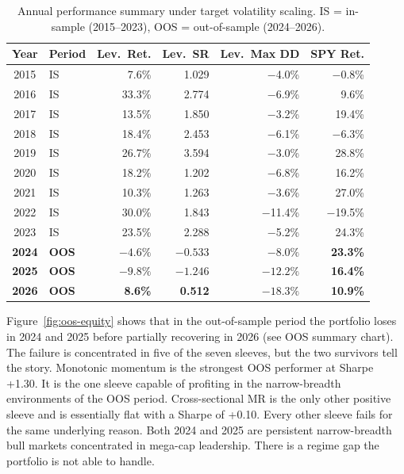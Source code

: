 \documentclass{article}
\begin{document}
\begin{table}[htbp]
    \centering
    \small
    \begin{tabular}{clrrrr}
        \toprule
        Year & Period & Lev.\ Ret. & Lev.\ SR & Lev.\ Max DD & SPY Ret. \\
        \midrule
        2015 & IS &     7.6\% &    1.029 &  $-$4.0\% &  $-$0.8\% \\
        2016 & IS &    33.3\% &    2.774 &  $-$6.9\% &   9.6\% \\
        2017 & IS &    13.5\% &    1.850 &  $-$3.2\% &  19.4\% \\
        2018 & IS &    18.4\% &    2.453 &  $-$6.1\% &  $-$6.3\% \\
        2019 & IS &    26.7\% &    3.594 &  $-$3.0\% &  28.8\% \\
        2020 & IS &    18.2\% &    1.202 &  $-$6.8\% &  16.2\% \\
        2021 & IS &    10.3\% &    1.263 &  $-$3.6\% &  27.0\% \\
        2022 & IS &    30.0\% &    1.843 & $-$11.4\% & $-$19.5\% \\
        2023 & IS &    23.5\% &    2.288 &  $-$5.2\% &  24.3\% \\
        \midrule
        \textbf{2024} & \textbf{OOS} & $\mathbf{-4.6\%}$  & $\mathbf{-0.533}$ & $\mathbf{-8.0\%}$  & \textbf{23.3\%} \\
        \textbf{2025} & \textbf{OOS} & $\mathbf{-9.8\%}$  & $\mathbf{-1.246}$ & $\mathbf{-12.2\%}$ & \textbf{16.4\%} \\
        \textbf{2026} & \textbf{OOS} & \textbf{8.6\%}     & \textbf{0.512}    & $\mathbf{-18.3\%}$ & \textbf{10.9\%} \\
        \bottomrule
    \end{tabular}
    \caption{Annual performance summary under target volatility scaling. IS = in-sample (2015--2023), OOS = out-of-sample (2024--2026).}
    \label{tab:annual-performance}
\end{table}

Figure~\ref{fig:oos-equity} shows that in the out-of-sample period the portfolio loses in 2024 and 2025 before partially recovering in 2026 (see OOS summary chart). The failure is concentrated in five of the seven sleeves, but the two survivors tell the story. Monotonic momentum is the strongest OOS performer at Sharpe +1.30. It is the one sleeve capable of profiting in the narrow-breadth environments of the OOS period. Cross-sectional MR is the only other positive sleeve and is essentially flat with a Sharpe of +0.10. Every other sleeve fails for the same underlying reason. Both 2024 and 2025 are persistent narrow-breadth bull markets concentrated in mega-cap leadership. There is a regime gap the portfolio is not able to handle.
\end{document}

